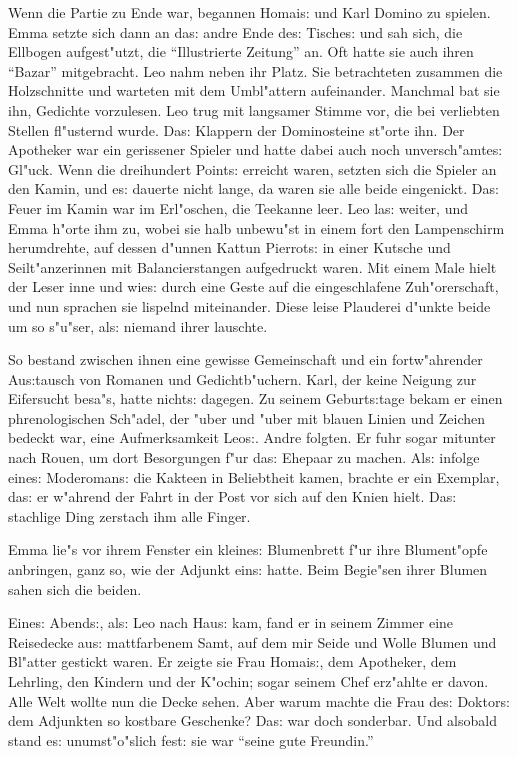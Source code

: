 \documentclass[oneside,12pt]{book}
\newcommand{\s}{s:}%
\begin{document}
Wenn die Partie zu Ende war, begannen Homai{\s} und Karl Domino zu
spielen. Emma setzte sich dann an da{\s} andre Ende de{\s}
Tische{\s} und sah sich, die Ellbogen aufgest"utzt, die
"`Illustrierte Zeitung"' an. Oft hatte sie auch ihren "`Bazar"'
mitgebracht. Leo nahm neben ihr Platz. Sie betrachteten zusammen
die Holzschnitte und warteten mit dem Umbl"attern aufeinander.
Manchmal bat sie ihn, Gedichte vorzulesen. Leo trug mit langsamer
Stimme vor, die bei verliebten Stellen fl"usternd wurde. Da{\s}
Klappern der Dominosteine st"orte ihn. Der Apotheker war ein
gerissener Spieler und hatte dabei auch noch unversch"amte{\s}
Gl"uck. Wenn die dreihundert Point{\s} erreicht waren, setzten
sich die Spieler an den Kamin, und e{\s} dauerte nicht lange, da
waren sie alle beide eingenickt. Da{\s} Feuer im Kamin war im
Erl"oschen, die Teekanne leer. Leo la{\s} weiter, und Emma h"orte
ihm zu, wobei sie halb unbewu"st in einem fort den Lampenschirm
herumdrehte, auf dessen d"unnen Kattun Pierrot{\s} in einer
Kutsche und Seilt"anzerinnen mit Balancierstangen aufgedruckt
waren. Mit einem Male hielt der Leser inne und wie{\s} durch eine
Geste auf die eingeschlafene Zuh"orerschaft, und nun sprachen sie
lispelnd miteinander. Diese leise Plauderei d"unkte beide um so
s"u"ser, al{\s} niemand ihrer lauschte.

So bestand zwischen ihnen eine gewisse Gemeinschaft und ein
fortw"ahrender Au{\s}tausch von Romanen und Gedichtb"uchern. Karl,
der keine Neigung zur Eifersucht besa"s, hatte nicht{\s} dagegen.
Zu seinem Geburt{\s}tage bekam er einen phrenologischen Sch"adel,
der "uber und "uber mit blauen Linien und Zeichen bedeckt war,
eine Aufmerksamkeit Leo{\s}. Andre folgten. Er fuhr sogar mitunter
nach Rouen, um dort Besorgungen f"ur da{\s} Ehepaar zu machen.
Al{\s} infolge eine{\s} Moderoman{\s} die Kakteen in Beliebtheit
kamen, brachte er ein Exemplar, da{\s} er w"ahrend der Fahrt in
der Post vor sich auf den Knien hielt. Da{\s} stachlige Ding
zerstach ihm alle Finger.

Emma lie"s vor ihrem Fenster ein kleine{\s} Blumenbrett f"ur ihre
Blu\-men\-t"opfe anbringen, ganz so, wie der Adjunkt ein{\s}
hatte. Beim Begie"sen ihrer Blumen sahen sich die beiden.

Eine{\s} Abend{\s}, al{\s} Leo nach Hau{\s} kam, fand er in seinem
Zimmer eine Reisedecke au{\s} mattfarbenem Samt, auf dem mir Seide
und Wolle Blumen und Bl"atter gestickt waren. Er zeigte sie Frau
Homai{\s}, dem Apotheker, dem Lehrling, den Kindern und der
K"ochin; sogar seinem Chef erz"ahlte er davon. Alle Welt wollte
nun die Decke sehen. Aber warum machte die Frau de{\s} Doktor{\s}
dem Adjunkten so kostbare Geschenke? Da{\s} war doch sonderbar.
Und alsobald stand e{\s} unumst"o"slich fest: sie war "`seine gute
Freundin."'
\end{document}
